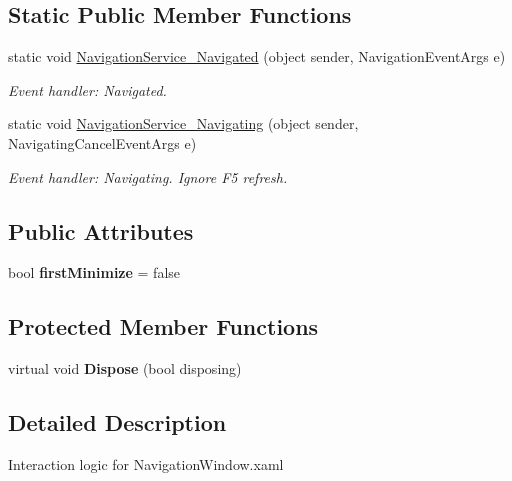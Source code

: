 \subsection*{Static Public Member Functions}
\begin{DoxyCompactItemize}
\item 
static void \hyperlink{classwin__client_1_1_my_navigation_window_a09d7873bccd58aa9857555b5dcc0586f}{Navigation\-Service\-\_\-\-Navigated} (object sender, Navigation\-Event\-Args e)
\begin{DoxyCompactList}\small\item\em Event handler\-: Navigated. \end{DoxyCompactList}\item 
static void \hyperlink{classwin__client_1_1_my_navigation_window_ac7c0fa31c47b2c14c11fd0c235095217}{Navigation\-Service\-\_\-\-Navigating} (object sender, Navigating\-Cancel\-Event\-Args e)
\begin{DoxyCompactList}\small\item\em Event handler\-: Navigating. Ignore F5 refresh. \end{DoxyCompactList}\end{DoxyCompactItemize}
\subsection*{Public Attributes}
\begin{DoxyCompactItemize}
\item 
\hypertarget{classwin__client_1_1_my_navigation_window_afa4abbb6addfe092ef2c0aac1dda6ce3}{bool {\bfseries first\-Minimize} = false}\label{classwin__client_1_1_my_navigation_window_afa4abbb6addfe092ef2c0aac1dda6ce3}

\end{DoxyCompactItemize}
\subsection*{Protected Member Functions}
\begin{DoxyCompactItemize}
\item 
\hypertarget{classwin__client_1_1_my_navigation_window_a363b01f992f6b8eec68e7188a86c6ee2}{virtual void {\bfseries Dispose} (bool disposing)}\label{classwin__client_1_1_my_navigation_window_a363b01f992f6b8eec68e7188a86c6ee2}

\end{DoxyCompactItemize}


\subsection{Detailed Description}
Interaction logic for Navigation\-Window.\-xaml 



